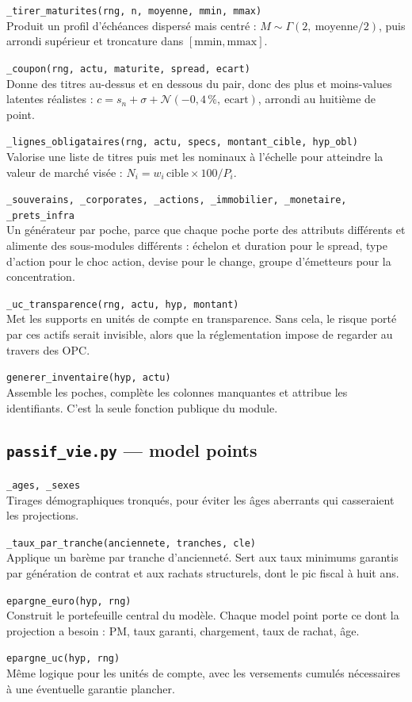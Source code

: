 \documentclass[10pt,a4paper]{article}
\newcommand{\fn}[2]{\par\smallskip\textcolor{bleufonce}{\texttt{#1}}\\ #2\par}
\begin{document}
\fn{\_tirer\_maturites(rng, n, moyenne, mmin, mmax)}{Produit un profil d'échéances dispersé mais
centré : $M \sim \Gamma(2,\ \text{moyenne}/2)$, puis arrondi supérieur et troncature dans
$[\text{mmin}, \text{mmax}]$.}

\fn{\_coupon(rng, actu, maturite, spread, ecart)}{Donne des titres au-dessus et en dessous du
pair, donc des plus et moins-values latentes réalistes :
$c = s_n + \sigma + \mathcal{N}(-0{,}4\,\%,\ \text{ecart})$, arrondi au huitième de point.}

\fn{\_lignes\_obligataires(rng, actu, specs, montant\_cible, hyp\_obl)}{Valorise une liste de
titres puis met les nominaux à l'échelle pour atteindre la valeur de marché visée :
$N_i = w_i\, \text{cible} \times 100 / P_i$.}

\fn{\_souverains, \_corporates, \_actions, \_immobilier, \_monetaire, \_prets\_infra}{Un
générateur par poche, parce que chaque poche porte des attributs différents et alimente des
sous-modules différents : échelon et duration pour le spread, type d'action pour le choc action,
devise pour le change, groupe d'émetteurs pour la concentration.}

\fn{\_uc\_transparence(rng, actu, hyp, montant)}{Met les supports en unités de compte en
transparence. Sans cela, le risque porté par ces actifs serait invisible, alors que la
réglementation impose de regarder au travers des OPC.}

\fn{generer\_inventaire(hyp, actu)}{Assemble les poches, complète les colonnes manquantes et
attribue les identifiants. C'est la seule fonction publique du module.}

\subsection{\texttt{passif\_vie.py} — model points}

\fn{\_ages, \_sexes}{Tirages démographiques tronqués, pour éviter les âges aberrants qui
casseraient les projections.}

\fn{\_taux\_par\_tranche(anciennete, tranches, cle)}{Applique un barème par tranche
d'ancienneté. Sert aux taux minimums garantis par génération de contrat et aux rachats
structurels, dont le pic fiscal à huit ans.}

\fn{epargne\_euro(hyp, rng)}{Construit le portefeuille central du modèle. Chaque model point
porte ce dont la projection a besoin : PM, taux garanti, chargement, taux de rachat, âge.}

\fn{epargne\_uc(hyp, rng)}{Même logique pour les unités de compte, avec les versements cumulés
nécessaires à une éventuelle garantie plancher.}
\end{document}
